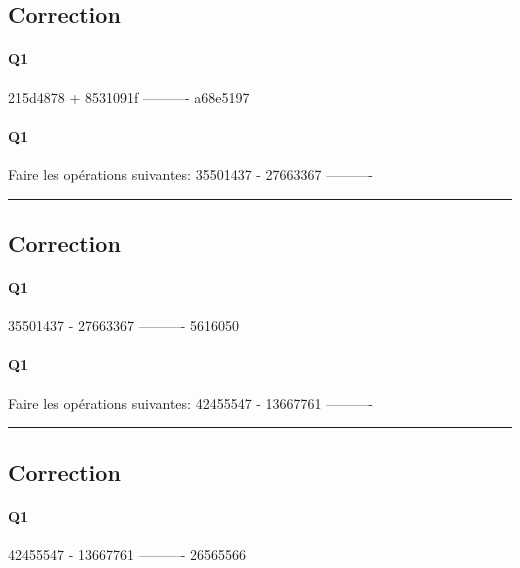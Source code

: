 \subsection{Correction}


\paragraph{Q1}

  215d4878
+ 8531091f
----------
  a68e5197

\pagebreak

\paragraph{Q1}

Faire les opérations suivantes: 
  35501437
- 27663367
----------



\hrule width 1\linewidth
\pagebreak

\subsection{Correction}


\paragraph{Q1}

  35501437
- 27663367
----------
   5616050

\pagebreak

\paragraph{Q1}

Faire les opérations suivantes: 
  42455547
- 13667761
----------



\hrule width 1\linewidth
\pagebreak

\subsection{Correction}


\paragraph{Q1}

  42455547
- 13667761
----------
  26565566

\pagebreak


